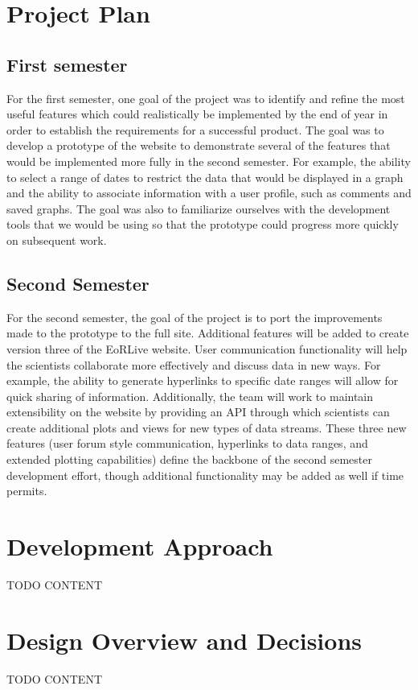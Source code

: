 \documentclass[12pt]{article}
\begin{document}
\begin{spacing}{1.5}
\section{Project Plan}
\subsection{First semester}
For the first semester, one goal of the project was to identify and refine the most useful features which could realistically be implemented by the end of year in order to establish the requirements for a successful product. The goal was to develop a prototype of the website to demonstrate several of the features that would be implemented more fully in the second semester. For example, the ability to select a range of dates to restrict the data that would be displayed in a graph and the ability to associate information with a user profile, such as comments and saved graphs. The goal was also to familiarize ourselves with the development tools that we would be using so that the prototype could progress more quickly on subsequent work.
\subsection{Second Semester}
For the second semester, the goal of the project is to port the improvements made to the prototype to the full site. Additional features will be added to create version three of the EoRLive website. User communication functionality will help the scientists collaborate more effectively and discuss data in new ways. For example, the ability to generate hyperlinks to specific date ranges will allow for quick sharing of information. Additionally, the team will work to maintain extensibility on the website by providing an API through which scientists can create additional plots and views for new types of data streams. These three new features (user forum style communication, hyperlinks to data ranges, and extended plotting capabilities) define the backbone of the second semester development effort, though additional functionality may be added as well if time permits.

\section{Development Approach}
TODO CONTENT

\section{Design Overview and Decisions}
TODO CONTENT


\end{spacing}
\end{document}
